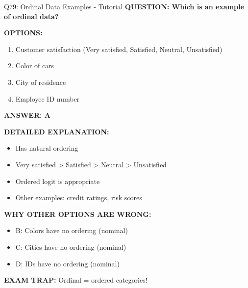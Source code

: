 \documentclass[8pt]{beamer}
\begin{document}
	\begin{frame}{Q79: Ordinal Data Examples - Tutorial}
		\fontsize{6.5}{7.5}\selectfont
		\textbf{QUESTION: Which is an example of ordinal data?}
		
		\vspace{0.1cm}
		\textbf{OPTIONS:}
		\begin{enumerate}
			\item Customer satisfaction (Very satisfied, Satisfied, Neutral, Unsatisfied)
			\item Color of cars
			\item City of residence
			\item Employee ID number
		\end{enumerate}
		
		\vspace{0.1cm}
		\textcolor{myblue}{\textbf{ANSWER: A}}
		
		\vspace{0.1cm}
		\textbf{DETAILED EXPLANATION:}
		\begin{itemize}
			\item Has natural ordering
			\item Very satisfied > Satisfied > Neutral > Unsatisfied
			\item Ordered logit is appropriate
			\item Other examples: credit ratings, risk scores
		\end{itemize}
		
		\vspace{0.1cm}
		\textcolor{myred}{\textbf{WHY OTHER OPTIONS ARE WRONG:}}
		\begin{itemize}
			\item \textcolor{myred}{B:} Colors have no ordering (nominal)
			\item \textcolor{myred}{C:} Cities have no ordering (nominal)
			\item \textcolor{myred}{D:} IDs have no ordering (nominal)
		\end{itemize}
		
		\textcolor{myred}{\textbf{EXAM TRAP:}} Ordinal = \textcolor{myblue}{ordered categories}!
	\end{frame}
	
\end{document}
